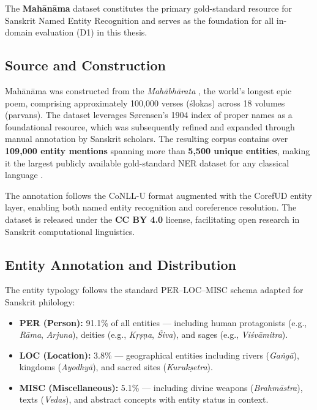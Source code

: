 The \textbf{Mahānāma} dataset \cite{sarkar2025mahanama} constitutes the primary gold-standard resource for Sanskrit Named Entity Recognition and serves as the foundation for all in-domain evaluation (D1) in this thesis.

\subsection{Source and Construction}
\label{subsec:mahanama_source}

Mahānāma was constructed from the \textit{Mahābhārata} \cite{mahabharata}, the world's longest epic poem, comprising approximately 100,000 verses (ślokas) across 18 volumes (parvans). The dataset leverages Sørensen's 1904 index of proper names \cite{sorensen1904index} as a foundational resource, which was subsequently refined and expanded through manual annotation by Sanskrit scholars. The resulting corpus contains over \textbf{109,000 entity mentions} spanning more than \textbf{5,500 unique entities}, making it the largest publicly available gold-standard NER dataset for any classical language \cite{sarkar2025mahanama}.

The annotation follows the CoNLL-U format augmented with the CorefUD entity layer, enabling both named entity recognition and coreference resolution. The dataset is released under the \textbf{CC BY 4.0} license, facilitating open research in Sanskrit computational linguistics.

\subsection{Entity Annotation and Distribution}
\label{subsec:entity_distribution}

The entity typology follows the standard PER–LOC–MISC schema adapted for Sanskrit philology:

\begin{itemize}
    \item \textbf{PER (Person):} 91.1\% of all entities — including human protagonists (e.g., \textit{Rāma}, \textit{Arjuna}), deities (e.g., \textit{Kṛṣṇa}, \textit{Śiva}), and sages (e.g., \textit{Viśvāmitra}).
    \item \textbf{LOC (Location):} 3.8\% — geographical entities including rivers (\textit{Gaṅgā}), kingdoms (\textit{Ayodhyā}), and sacred sites (\textit{Kurukṣetra}).
    \item \textbf{MISC (Miscellaneous):} 5.1\% — including divine weapons (\textit{Brahmāstra}), texts (\textit{Vedas}), and abstract concepts with entity status in context.
\end{itemize}

